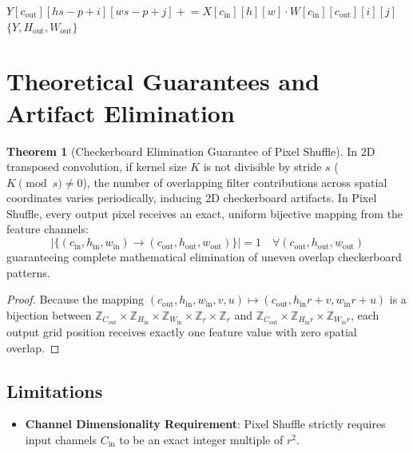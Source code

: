 \documentclass[11pt,a4paper]{article}
\theoremstyle{definition}
\newtheorem{theorem}{Theorem}[section]
\begin{document}
\begin{algorithm}[H]
\begin{algorithmic}[1]
                            \State $Y[c_{\text{out}}][h s - p + i][w s - p + j] \mathrel{+}= X[c_{\text{in}}][h][w] \cdot W[c_{\text{in}}][c_{\text{out}}][i][j]$
                        \EndFor
                    \EndFor
                \EndFor
            \EndFor
        \EndFor
    \EndFor
\EndIf
\State \Return $\{Y, H_{\text{out}}, W_{\text{out}}\}$
\end{algorithmic}
\end{algorithm}

\section{Theoretical Guarantees and Artifact Elimination}

\begin{theorem}[Checkerboard Elimination Guarantee of Pixel Shuffle]
In 2D transposed convolution, if kernel size $K$ is not divisible by stride $s$ ($K \pmod s \ne 0$), the number of overlapping filter contributions across spatial coordinates varies periodically, inducing 2D checkerboard artifacts. In Pixel Shuffle, every output pixel receives an exact, uniform bijective mapping from the feature channels:
\begin{equation}
|\{(c_{\text{in}}, h_{\text{in}}, w_{\text{in}}) \to (c_{\text{out}}, h_{\text{out}}, w_{\text{out}})\}| = 1 \quad \forall (c_{\text{out}}, h_{\text{out}}, w_{\text{out}})
\end{equation}
guaranteeing complete mathematical elimination of uneven overlap checkerboard patterns.
\end{theorem}

\begin{proof}
Because the mapping $(c_{\text{out}}, h_{\text{in}}, w_{\text{in}}, v, u) \mapsto (c_{\text{out}}, h_{\text{in}} r + v, w_{\text{in}} r + u)$ is a bijection between $\mathbb{Z}_{C_{\text{out}}} \times \mathbb{Z}_{H_{\text{in}}} \times \mathbb{Z}_{W_{\text{in}}} \times \mathbb{Z}_r \times \mathbb{Z}_r$ and $\mathbb{Z}_{C_{\text{out}}} \times \mathbb{Z}_{H_{\text{in}} r} \times \mathbb{Z}_{W_{\text{in}} r}$, each output grid position receives exactly one feature value with zero spatial overlap.
\end{proof}

\subsection{Limitations}
\begin{itemize}
    \item \textbf{Channel Dimensionality Requirement}: Pixel Shuffle strictly requires input channels $C_{\text{in}}$ to be an exact integer multiple of $r^2$.
\end{itemize}
\end{document}
